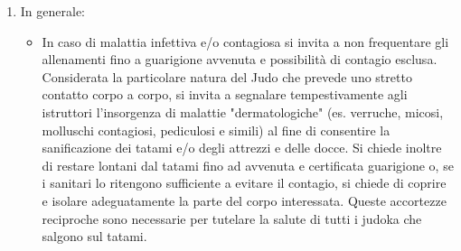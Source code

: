 \documentclass{djtsasddoc}
\begin{document}
\begin{enumerate}
\begin{enumerate}
\begin{itemize}
			\end{itemize}
			\item In generale:
			\begin{itemize}
				\item In caso di malattia infettiva e/o contagiosa si invita a non frequentare gli allenamenti fino a guarigione avvenuta e possibilità di contagio esclusa. Considerata la particolare natura del Judo che prevede uno stretto contatto corpo a corpo, si invita a segnalare tempestivamente agli istruttori l'insorgenza di malattie "dermatologiche" (es. verruche, micosi, molluschi contagiosi, pediculosi e simili) al fine di consentire la sanificazione dei tatami e/o degli attrezzi e delle docce. Si chiede inoltre di restare lontani dal tatami fino ad avvenuta e certificata guarigione o, se i sanitari lo ritengono sufficiente a evitare il contagio, si chiede di coprire e isolare adeguatamente la parte del corpo interessata. Queste accortezze reciproche sono necessarie per tutelare la salute di tutti i judoka che salgono sul tatami.
			\end{itemize}
		\end{enumerate}
	\end{enumerate}
	
\end{document}
